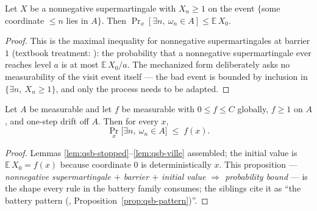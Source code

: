 \begin{blemma}
\label{lem:qsb-ville}
Let $X$ be a nonnegative supermartingale with $X_n \ge 1$ on the event
$\{$some coordinate $\le n$ lies in $A\}$. Then
$\Pr_x[\exists n,\ \omega_n \in A] \le \mathbb{E}\,X_0$.
\end{blemma}
\begin{proof}
This is the maximal inequality for nonnegative supermartingales at
barrier $1$ \cite{ville1939} (textbook treatment: \cite{doob1953}): the
probability that a nonnegative supermartingale ever reaches level $a$ is
at most $\mathbb{E}\,X_0 / a$. The mechanized form deliberately asks no
measurability of the visit event itself --- the bad event is bounded by
inclusion in $\{\exists n,\ X_n \ge 1\}$, and only the process needs to
be adapted.
\end{proof}

\begin{bprop}\label{prop:qsb-pattern}
Let $A$ be measurable and let $f$ be measurable with
$0 \le f \le C$ globally, $f \ge 1$ on $A$, and one-step drift off $A$.
Then for every $x$,
\[
\Pr_x\bigl[\exists n,\ \omega_n \in A\bigr] \;\le\; f(x).
\]
\end{bprop}
\begin{proof}
Lemmas \ref{lem:qsb-stopped}--\ref{lem:qsb-ville} assembled; the initial
value is $\mathbb{E}\,X_0 = f(x)$ because coordinate $0$ is
deterministically $x$. This proposition --- \emph{nonnegative
supermartingale $+$ barrier $+$ initial value $\Rightarrow$ probability
bound} --- is the shape every rule in the battery family consumes; the
siblings cite it as ``the battery pattern
(, Proposition~\ref{prop:qsb-pattern})''.
\end{proof}

